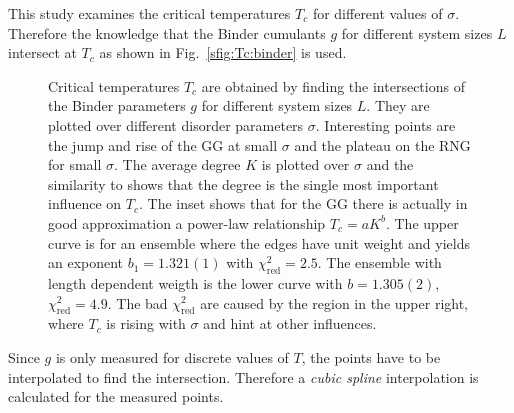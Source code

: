 \documentclass[pre,twocolumn,groupedaddress,showpacs,showkeys,amsmath,amssymb,floatfix]{revtex4-1}
\begin{document}
        This study examines the critical temperatures $T_c$ for different values of $\sigma$.
        Therefore the knowledge that the Binder cumulants $g$ for different
        system sizes $L$ intersect at $T_c$ \cite{Binder1981} as shown in Fig.~\ref{sfig:Tc:binder}
        is used.
        \begin{figure}[hbtp]
            \caption[Critical Temperature over Different Disorder Parameters]
            {
                 Critical temperatures \(T_c\) are obtained by finding the intersections
                of the Binder parameters $g$ for different system sizes $L$.
                 They are plotted over different disorder parameters \(\sigma\).
                Interesting points are the jump and rise of the GG at small
                \(\sigma\) and the plateau on the RNG for small \(\sigma\).
                 The average degree \(K\) is plotted over $\sigma$ and
                the similarity to  shows that the degree is the single
                most important influence on $T_c$. The inset shows that for the GG there
                is actually in good approximation a power-law relationship \(T_c = aK^b\).
                The upper curve is for an ensemble where the edges have unit weight and
                yields an exponent $b_1=1.321(1)$ with $\chi_{\mathrm{red}}^2 = 2.5$.
                The ensemble with length dependent weigth is the lower curve with
                $b = 1.305(2)$, $\chi_{\mathrm{red}}^2 = 4.9$.
                The bad $\chi_\mathrm{red}^2$ are caused by the region in the upper right,
                where $T_c$ is rising with $\sigma$ and hint at other influences.
            }
            \label{fig:Tc}
        \end{figure}
        Since \(g\) is only measured for discrete values of \(T\),
        the points have to be interpolated to find the intersection. Therefore
        a \emph{cubic spline} \cite{press2007numerical} interpolation %
        is calculated for the measured points.
\end{document}
